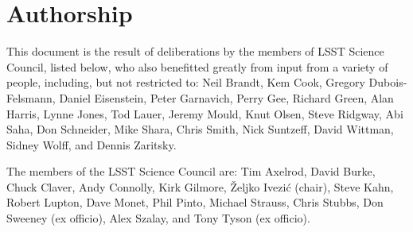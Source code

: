 \section{Authorship}

This document is the result of deliberations by the members of
LSST Science Council, listed below, who also benefitted greatly from
input from a variety of people, including, but not restricted to:
Neil Brandt, Kem Cook, Gregory Dubois-Felsmann, Daniel Eisenstein,
Peter Garnavich, Perry Gee, Richard Green, Alan Harris, Lynne Jones,
Tod Lauer, Jeremy Mould, Knut Olsen,
Steve Ridgway, Abi Saha, Don Schneider, Mike Shara, Chris Smith, Nick
Suntzeff, David Wittman, Sidney Wolff, and Dennis Zaritsky.

The members of the LSST Science Council are:
 Tim Axelrod,
 David Burke,
 Chuck Claver,
 Andy Connolly,
 Kirk Gilmore,
 \v{Z}eljko Ivezi\'{c} (chair),
 Steve Kahn,
 Robert Lupton,
 Dave Monet,
 Phil Pinto,
 Michael Strauss,
 Chris Stubbs,
 Don Sweeney (ex officio),
 Alex Szalay, and
 Tony Tyson (ex officio).
